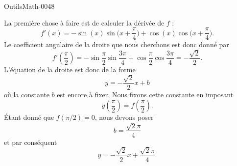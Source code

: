 
\begin{corrige}{OutilsMath-0048}

    La première chose à faire est de calculer la dérivée de $f$ :
    \begin{equation}
        f'(x)=-\sin(x)\sin\big( x+\frac{ \pi }{ 4 } \big)+\cos(x)\cos\big( x+\frac{ \pi }{ 4 } \big).
    \end{equation}
    Le coefficient angulaire de la droite que nous cherchons est donc donné par
    \begin{equation}
        f'\left( \frac{ \pi }{ 2 } \right)=-\sin\frac{ \pi }{2}\sin\frac{ 3\pi }{ 4 }+\cos\frac{ \pi }{2}\cos\frac{ 3\pi }{ 4 }=-\frac{ \sqrt{2} }{2}.
    \end{equation}
    L'équation de la droite est donc de la forme
    \begin{equation}
        y=-\frac{ \sqrt{2} }{2}x+b
    \end{equation}
    où la constante $b$ est encore à fixer. Nous fixons cette constante en imposant
    \begin{equation}
        y\left( \frac{ \pi }{2} \right)=f\left( \frac{ \pi }{2} \right).
    \end{equation}
    Étant donné que $f(\pi/2)=0$, nous devons poser
    \begin{equation}
        b=\frac{ \sqrt{2}\pi }{ 4 } 
    \end{equation}
    et par conséquent
    \begin{equation}
        y=-\frac{ \sqrt{2} }{2}x+\frac{ \sqrt{2}\pi }{ 4 }.
    \end{equation}

\end{corrige}
